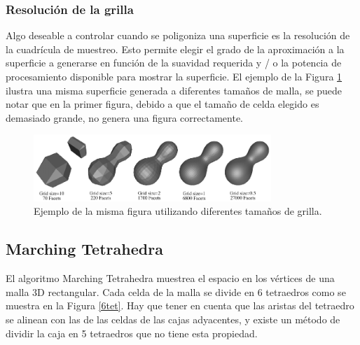 \documentclass[12pt]{article}
\begin{document}
\subsubsection{Resolución de la grilla}
Algo deseable a controlar cuando se poligoniza una superficie es la resolución de la cuadrícula de muestreo. Esto permite elegir el grado de la aproximación a la superficie a generarse en función de la suavidad requerida y / o la potencia de procesamiento disponible para mostrar la superficie. El ejemplo de la Figura \ref{mani} ilustra una misma superficie generada a diferentes tamaños de malla, se puede notar que en la primer figura, debido a que el tamaño de celda elegido es demasiado grande, no genera una figura correctamente.
\clearpage
\begin{figure}[h!]
\includegraphics[width=0.8\textwidth,center]{marchingcubes4.png}
\caption{Ejemplo de la misma figura utilizando diferentes tamaños de grilla.}
\label{mani}
\end{figure}

\subsection{Marching Tetrahedra}
El algoritmo Marching Tetrahedra\cite{marching}\cite{marchingt} muestrea el espacio en los vértices de una malla 3D rectangular. Cada celda de la malla se divide en 6 tetraedros como se muestra en la Figura \ref{6tet}. Hay que tener en cuenta que las aristas del tetraedro se alinean con las de las celdas de las cajas adyacentes, y existe un método de dividir la caja en 5 tetraedros que no tiene esta propiedad.
\end{document}
